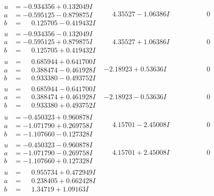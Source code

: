\documentclass[1p]{elsarticle_modified}
\theoremstyle{definition}
\begin{document}
$$\begin{array}{c|c|c}
\begin{aligned}
u &= -0.934356 + 0.132049 I \\
a &= -0.595125 - 0.879875 I \\
b &= \phantom{-}0.125705 - 0.419432 I\end{aligned}
 & \phantom{-}4.35527 - 1.06386 I & \phantom{-0.000000 } 0 \\ \hline\begin{aligned}
u &= -0.934356 - 0.132049 I \\
a &= -0.595125 + 0.879875 I \\
b &= \phantom{-}0.125705 + 0.419432 I\end{aligned}
 & \phantom{-}4.35527 + 1.06386 I & \phantom{-0.000000 } 0 \\ \hline\begin{aligned}
u &= \phantom{-}0.685944 + 0.641700 I \\
a &= \phantom{-}0.388474 - 0.461928 I \\
b &= \phantom{-}0.933380 - 0.493752 I\end{aligned}
 & -2.18923 + 0.53636 I & \phantom{-0.000000 } 0 \\ \hline\begin{aligned}
u &= \phantom{-}0.685944 - 0.641700 I \\
a &= \phantom{-}0.388474 + 0.461928 I \\
b &= \phantom{-}0.933380 + 0.493752 I\end{aligned}
 & -2.18923 - 0.53636 I & \phantom{-0.000000 } 0 \\ \hline\begin{aligned}
u &= -0.450323 + 0.960878 I \\
a &= -1.071790 + 0.269758 I \\
b &= -1.107660 - 0.127328 I\end{aligned}
 & \phantom{-}4.15701 - 2.45008 I & \phantom{-0.000000 } 0 \\ \hline\begin{aligned}
u &= -0.450323 - 0.960878 I \\
a &= -1.071790 - 0.269758 I \\
b &= -1.107660 + 0.127328 I\end{aligned}
 & \phantom{-}4.15701 + 2.45008 I & \phantom{-0.000000 } 0 \\ \hline\begin{aligned}
u &= \phantom{-}0.955734 + 0.472949 I \\
a &= \phantom{-}0.238405 + 0.662428 I \\
b &= \phantom{-}1.34719 + 1.09163 I\end{aligned}

\end{array}$$
\end{document}
